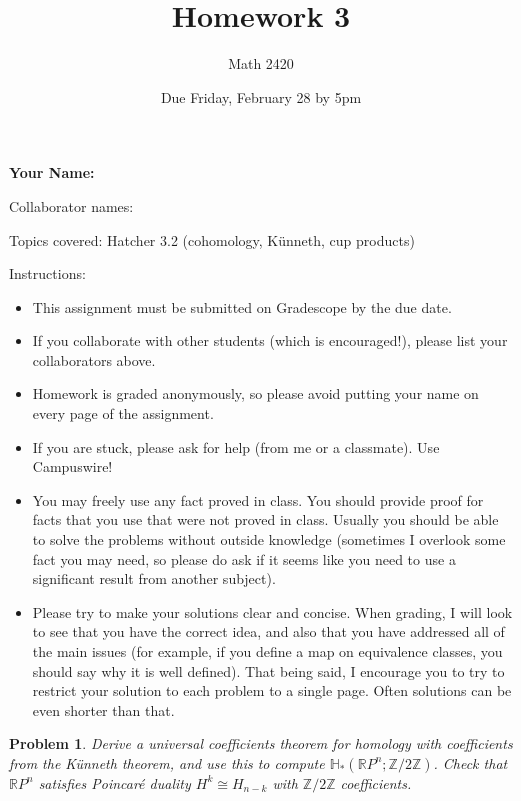 \documentclass[11pt]{article}
\author{Math 2420}
\date{Due Friday, February 28 by 5pm}
\title{Homework 3}
\newtheorem{problem}{Problem}
\begin{document}
\maketitle

{\bf\Large Your Name:} 

Collaborator names: 


\vspace{.3in}
Topics covered: Hatcher 3.2 (cohomology, K\"unneth, cup products)

Instructions: 
\begin{itemize}
\item This assignment must be submitted on Gradescope by the due date. 
\item If you collaborate with other students (which is encouraged!), please list your collaborators above. 
\item Homework is graded anonymously, so please avoid putting your name on every page of the assignment.
\item If you are stuck, please ask for help (from me or a classmate). Use Campuswire!  
\item You may freely use any fact proved in class. You should provide proof for facts that you use that were not proved in class. Usually you should be able to solve the problems without outside knowledge (sometimes I overlook some fact you may need, so please do ask if it seems like you need to use a significant result from another subject). 
\item Please try to make your solutions clear and concise. When grading, I will look to see that you have the correct idea, and also that you have addressed all of the main issues (for example, if you define a map on equivalence classes, you should say why it is well defined). That being said, I encourage you to try to restrict your solution to each problem to a single page. Often solutions can be even shorter than that. 
\end{itemize}
\pagebreak 


\begin{problem}
Derive a universal coefficients theorem for homology with coefficients from the K\"unneth theorem, and use this to compute $\mathbb H_*(\mathbb RP^n;\mathbb Z/2\mathbb Z)$. Check that $\mathbb RP^n$ satisfies Poincar\'e duality $H^k\cong H_{n-k}$ with $\mathbb Z/2\mathbb Z$ coefficients. 
\end{problem}
\end{document}

